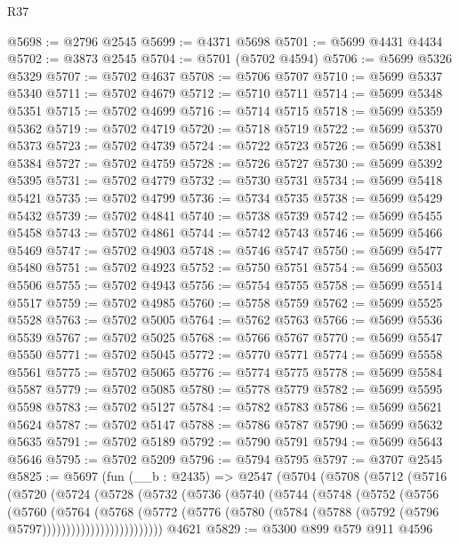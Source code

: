 \begin{lexlean}{R37}
\begin{coremodule}
@5698 := @2796 @2545
@5699 := @4371 @5698
@5701 := @5699 @4431 @4434
@5702 := @3873 @2545
@5704 := @5701 (@5702 @4594)
@5706 := @5699 @5326 @5329
@5707 := @5702 @4637
@5708 := @5706 @5707
@5710 := @5699 @5337 @5340
@5711 := @5702 @4679
@5712 := @5710 @5711
@5714 := @5699 @5348 @5351
@5715 := @5702 @4699
@5716 := @5714 @5715
@5718 := @5699 @5359 @5362
@5719 := @5702 @4719
@5720 := @5718 @5719
@5722 := @5699 @5370 @5373
@5723 := @5702 @4739
@5724 := @5722 @5723
@5726 := @5699 @5381 @5384
@5727 := @5702 @4759
@5728 := @5726 @5727
@5730 := @5699 @5392 @5395
@5731 := @5702 @4779
@5732 := @5730 @5731
@5734 := @5699 @5418 @5421
@5735 := @5702 @4799
@5736 := @5734 @5735
@5738 := @5699 @5429 @5432
@5739 := @5702 @4841
@5740 := @5738 @5739
@5742 := @5699 @5455 @5458
@5743 := @5702 @4861
@5744 := @5742 @5743
@5746 := @5699 @5466 @5469
@5747 := @5702 @4903
@5748 := @5746 @5747
@5750 := @5699 @5477 @5480
@5751 := @5702 @4923
@5752 := @5750 @5751
@5754 := @5699 @5503 @5506
@5755 := @5702 @4943
@5756 := @5754 @5755
@5758 := @5699 @5514 @5517
@5759 := @5702 @4985
@5760 := @5758 @5759
@5762 := @5699 @5525 @5528
@5763 := @5702 @5005
@5764 := @5762 @5763
@5766 := @5699 @5536 @5539
@5767 := @5702 @5025
@5768 := @5766 @5767
@5770 := @5699 @5547 @5550
@5771 := @5702 @5045
@5772 := @5770 @5771
@5774 := @5699 @5558 @5561
@5775 := @5702 @5065
@5776 := @5774 @5775
@5778 := @5699 @5584 @5587
@5779 := @5702 @5085
@5780 := @5778 @5779
@5782 := @5699 @5595 @5598
@5783 := @5702 @5127
@5784 := @5782 @5783
@5786 := @5699 @5621 @5624
@5787 := @5702 @5147
@5788 := @5786 @5787
@5790 := @5699 @5632 @5635
@5791 := @5702 @5189
@5792 := @5790 @5791
@5794 := @5699 @5643 @5646
@5795 := @5702 @5209
@5796 := @5794 @5795
@5797 := @3707 @2545
@5825 := @5697
    (fun (__b : @2435) =>
    @2547
      (@5704
        (@5708
          (@5712
            (@5716
              (@5720
                (@5724
                  (@5728
                    (@5732
                      (@5736
                        (@5740
                          (@5744
                            (@5748
                              (@5752
                                (@5756
                                  (@5760
                                    (@5764
                                      (@5768
                                        (@5772
                                          (@5776
                                            (@5780
                                              (@5784
                                                (@5788 (@5792 (@5796 @5797)))))))))))))))))))))))))
    @4621
@5829 := @5300 @899 @579 @911 @4596

\end{coremodule}
\end{lexlean}
